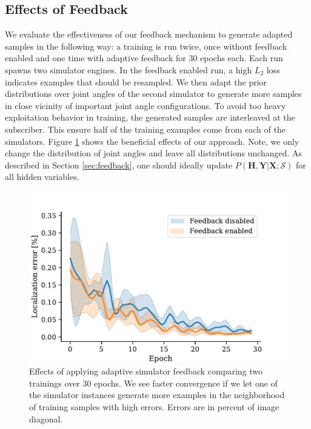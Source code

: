 \documentclass[conference]{IEEEtran}
\begin{document}
    \subsection{Effects of Feedback}
    We evaluate the effectiveness of our feedback mechanism to generate adapted samples in the following way: a training is run twice, once without feedback enabled and one time with adaptive feedback for 30 epochs each. Each run spawns two simulator engines. In the feedback enabled run, a high $L_2$ loss indicates examples that should be resampled. We then adapt the prior distributions over joint angles of the second simulator to generate more samples in close vicinity of important joint angle configurations. To avoid too heavy exploitation behavior in training, the generated samples are interleaved at the subscriber. This ensure half of the training examples come from each of the simulators. Figure \ref{fig:control} shows the beneficial effects of our approach. Note, we only change the distribution of joint angles and leave all distributions unchanged. As described in Section \ref{sec:feedback}, one should ideally update $P(\textbf{H},\textbf{Y} \lvert \textbf{X};\mathcal{S})$ for all hidden variables.

    \begin{figure}[htbp]
        \centerline{\includegraphics[width=0.9\columnwidth]{figures/control/control.pdf}}
        \caption{
            \label{fig:control} Effects of applying adaptive simulator feedback comparing two trainings over 30 epochs. We see faster convergence if we let one of the simulator instances generate more examples in the neighborhood of training samples with high errors. Errors are in percent of image diagonal.
        }
    \end{figure}
\end{document}
